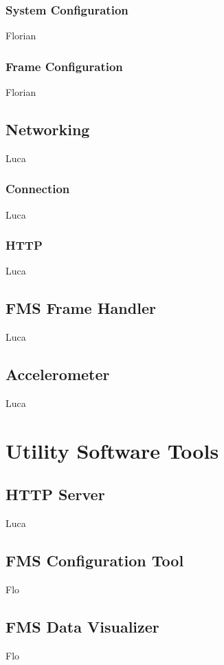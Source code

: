 \subsubsection{System Configuration}
Florian 
\subsubsection{Frame Configuration}
Florian 

\subsection{Networking}
Luca
\subsubsection{Connection}
Luca
\subsubsection{HTTP}
Luca
\subsection{FMS Frame Handler}
Luca
\subsection{Accelerometer}
Luca

\section{Utility Software Tools}
\subsection{HTTP Server}
Luca
\subsection{FMS Configuration Tool}
Flo
\subsection{FMS Data Visualizer}
Flo
